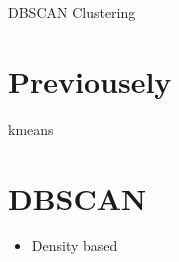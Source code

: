\begin{frame}[allowframebreaks]{DBSCAN Clustering}
    \section{Previousely}
        kmeans
    
    
    \section{DBSCAN}
        \begin{itemize}
            \item Density based
        \end{itemize}

\end{frame}